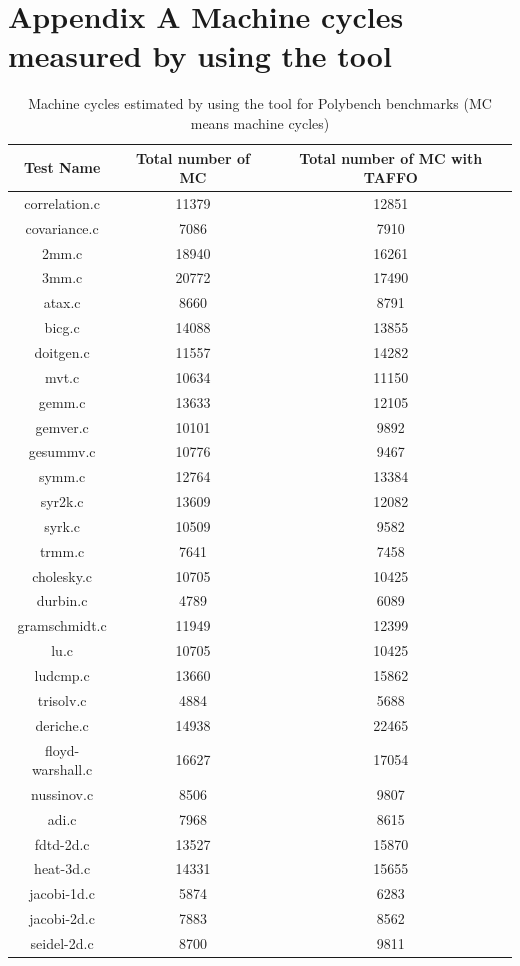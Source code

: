 \begin{table}
\section{\fontsize{12}{15}\selectfont Appendix A Machine cycles measured by using the tool}
\begin{center}
\caption{Machine cycles estimated by using the tool for Polybench benchmarks (MC means machine cycles)}
\vspace{0.2cm}
\begin{tabular}{ |c|c|c| } 
 \hline
Test Name & Total number of MC & Total number of MC with TAFFO \\
 \hline
 correlation.c & 11379 & 12851 \\
 \hline
  covariance.c & 7086 & 7910 \\
 \hline
  2mm.c & 18940 & 16261 \\
 \hline
  3mm.c & 20772 & 17490 \\
 \hline
  atax.c & 8660 & 8791 \\
 \hline
  bicg.c & 14088 & 13855 \\
 \hline
  doitgen.c & 11557 & 14282 \\
 \hline
  mvt.c & 10634 & 11150 \\
 \hline
  gemm.c & 13633 & 12105 \\
 \hline
  gemver.c & 10101 & 9892 \\
 \hline
  gesummv.c & 10776 & 9467 \\
 \hline
  symm.c & 12764 & 13384 \\
 \hline
  syr2k.c & 13609 & 12082 \\
 \hline
  syrk.c & 10509 & 9582 \\
 \hline
  trmm.c & 7641 & 7458 \\
 \hline
  cholesky.c & 10705 & 10425 \\
 \hline
  durbin.c & 4789 & 6089 \\
 \hline
  gramschmidt.c & 11949 & 12399 \\
 \hline
  lu.c & 10705 & 10425 \\
 \hline
  ludcmp.c & 13660 & 15862 \\
 \hline
  trisolv.c & 4884 & 5688 \\
 \hline
  deriche.c & 14938 & 22465 \\
 \hline
  floyd-warshall.c & 16627 & 17054 \\
 \hline
  nussinov.c & 8506 & 9807 \\
 \hline
  adi.c & 7968 & 8615 \\
 \hline
  fdtd-2d.c & 13527 & 15870 \\
 \hline
  heat-3d.c & 14331 & 15655 \\
 \hline
  jacobi-1d.c & 5874 & 6283 \\
 \hline
  jacobi-2d.c & 7883 & 8562 \\
 \hline
  seidel-2d.c & 8700 & 9811 \\
 \hline
\end{tabular}
\end{center}
\end{table}

